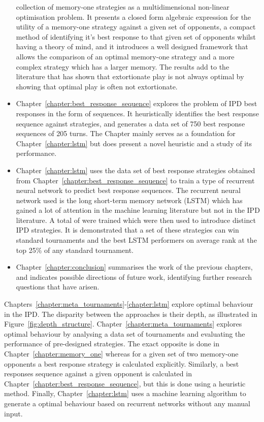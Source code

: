 \begin{itemize}
    collection of memory-one strategies as a multidimensional non-linear
    optimisation problem. It presents a closed form algebraic expression for the
    utility of a memory-one strategy against a given set of opponents, a
    compact method of identifying it's best response to that given set of
    opponents whilst having a theory of mind, and it introduces a well designed
    framework that allows the comparison of an optimal memory-one strategy and a
    more complex strategy which has a larger memory. The results add to the
    literature that has shown that extortionate play is not always optimal by
    showing that optimal play is often not extortionate.
    \item Chapter~\ref{chapter:best_response_sequence} explores the problem of
    IPD best responses in the form of sequences.
    It heuristically identifies the best response sequence against \numberofstrategiesbestsequences strategies,
    and generates a data set of 750 best response sequences of 205 turns.
    The Chapter mainly serves as a foundation for Chapter~\ref{chapter:lstm}
    but does present a novel heuristic and a study of its performance.
    \item Chapter~\ref{chapter:lstm} uses the data set of best response
    strategies obtained from Chapter~\ref{chapter:best_response_sequence} to
    train a type of recurrent neural network to predict best response sequences.
    The recurrent neural network used is the long short-term memory network
    (LSTM) which has gained a lot of attention in the machine learning
    literature but not in the IPD literature. A total of \lstmnetworks were
    trained which were then used to introduce \lstmstrategies distinct IPD
    strategies. It is demonstrated that a set of these strategies can win
    standard tournaments and the best LSTM performers on average rank at the top
    25\% of any standard tournament.
    \item Chapter~\ref{chapter:conclusion} summarises the work of the previous
    chapters, and indicates possible directions of future work, identifying
    further research questions that have arisen.
\end{itemize}

Chapters~\ref{chapter:meta_tournaments}-\ref{chapter:lstm} explore optimal
behaviour in the IPD. The disparity between the
approaches is their depth, as illustrated in Figure~\ref{fig:depth_structure}.
Chapter~\ref{chapter:meta_tournaments} explores optimal behaviour
by analysing a data set of tournaments and evaluating the performance of
pre-designed strategies. The exact opposite is done in
Chapter~\ref{chapter:memory_one} whereas for a given set of two
memory-one opponents a best response strategy is calculated explicitly.
Similarly, a best responses sequence against a given opponent is calculated in
Chapter~\ref{chapter:best_response_sequence}, but this is done using a heuristic
method. Finally, Chapter~\ref{chapter:lstm} uses a machine learning algorithm
to generate a optimal behaviour based on recurrent networks without any manual
input.

